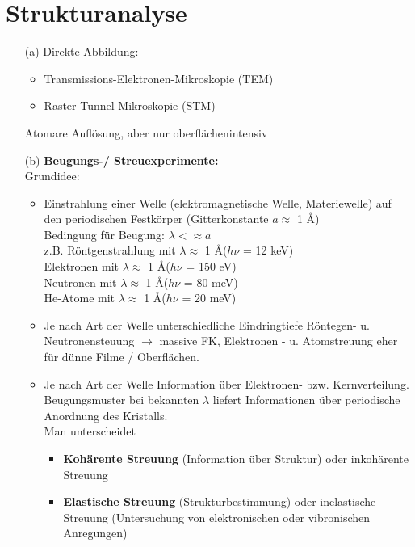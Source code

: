 \section{Strukturanalyse} \label{kap:3}
\begin{itemize}
    \item[(a)] Direkte Abbildung:\\
          \begin{itemize}
              \item Transmissions-Elektronen-Mikroskopie (TEM)
              \item Raster-Tunnel-Mikroskopie (STM)
          \end{itemize}
          Atomare Auflösung, aber nur oberflächenintensiv
    \item[(b)] \textbf{Beugungs-/ Streuexperimente:}\\
          Grundidee:
          \begin{itemize}
              \item Einstrahlung einer Welle (elektromagnetische Welle, Materiewelle) auf den periodischen Festkörper (Gitterkonstante $a \approx$ 1 \AA)\\
                    Bedingung für Beugung: $\lambda < \approx a$\\
                    z.B. Röntgenstrahlung mit $\lambda \approx$ 1 \AA ($h \nu$ = 12 keV)\\
                    Elektronen mit $\lambda \approx$ 1 \AA ($h \nu$ = 150 eV)\\
                    Neutronen mit $\lambda \approx$ 1 \AA ($h \nu$ = 80 meV)\\
                    He-Atome mit $\lambda \approx$ 1 \AA ($h \nu$ = 20 meV)
              \item Je nach Art der Welle unterschiedliche Eindringtiefe Röntegen- u. Neutronensteuung $\rightarrow$ massive FK, Elektronen - u. Atomstreuung eher für dünne Filme / Oberflächen.
              \item Je nach Art der Welle Information über Elektronen- bzw. Kernverteilung. Beugungsmuster bei bekannten $\lambda$ liefert Informationen über periodische Anordnung des Kristalls.\\
                    Man unterscheidet
                    \begin{itemize}
                        \item \textbf{Kohärente Streuung} (Information über Struktur) oder inkohärente Streuung
                        \item \textbf{Elastische Streuung} (Strukturbestimmung) oder inelastische Streuung (Untersuchung von elektronischen oder vibronischen Anregungen)
                    \end{itemize}
          \end{itemize}
\end{itemize}





